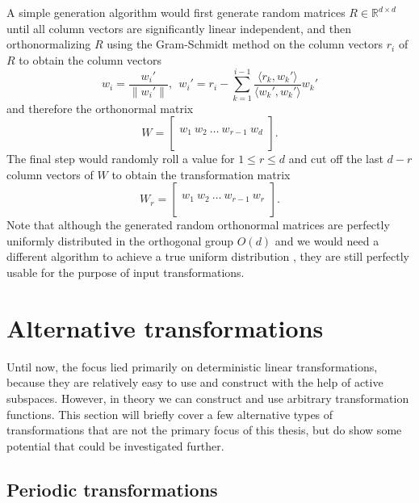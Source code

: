 \documentclass[
  a4paper,  %
  twoside,  %
  bibliography=totoc,
  headsepline,
  cleardoublepage=empty,
  parskip=half,
  draft=false
]{scrbook}
\begin{document}
A simple generation algorithm would first generate random matrices $R \in \mathds{R}^{d \times d}$ until all column vectors are significantly linear independent, and then orthonormalizing $R$ using the Gram-Schmidt method on the column vectors $r_i$ of $R$ to obtain the column vectors
\begin{equation}
w_i=\frac{w_i'}{\| w_i' \|},~~ w_i'=r_i - \sum_{k=1}^{i-1} \frac{\langle r_k,  w_k' \rangle}{\langle w_k', w_k' \rangle} w_k'
\end{equation}
and therefore the orthonormal matrix
\begin{equation}
W = \begin{bmatrix}
  \\
    w_1 ~ w_2 ~ \dots ~ w_{r-1} ~ w_d\\
    \\
  \end{bmatrix}.
\end{equation}
The final step would randomly roll a value for $1 \leq r \leq d$ and cut off the last $d-r$ column vectors of $W$ to obtain the transformation matrix
\begin{equation}
W_r = \begin{bmatrix}
  \\
    w_1 ~ w_2 ~ \dots ~ w_{r-1} ~ w_r\\
    \\
  \end{bmatrix}.
\end{equation}
Note that although the generated random orthonormal matrices are perfectly uniformly distributed in the orthogonal group $O(d)$ and we would need a different algorithm to achieve a true uniform distribution \cite{Wang2008}, they are still perfectly usable for the purpose of input transformations.

\section{Alternative transformations}

Until now, the focus lied primarily on deterministic linear transformations, because they are relatively easy to use and construct with the help of active subspaces.
However, in theory we can construct and use arbitrary transformation functions.
This section will briefly cover a few alternative types of transformations that are not the primary focus of this thesis, but do show some potential that could be investigated further.

\subsection{Periodic transformations}
\end{document}
